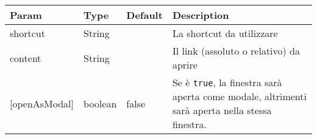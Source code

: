 \begin{longtable}[]{@{}llll@{}}
\toprule
\begin{minipage}[b]{0.22\columnwidth}\raggedright
Param\strut
\end{minipage} & \begin{minipage}[b]{0.22\columnwidth}\raggedright
Type\strut
\end{minipage} & \begin{minipage}[b]{0.22\columnwidth}\raggedright
Default\strut
\end{minipage} & \begin{minipage}[b]{0.22\columnwidth}\raggedright
Description\strut
\end{minipage}\tabularnewline
\midrule
\endhead
\begin{minipage}[t]{0.22\columnwidth}\raggedright
shortcut\strut
\end{minipage} & \begin{minipage}[t]{0.22\columnwidth}\raggedright
String\strut
\end{minipage} & \begin{minipage}[t]{0.22\columnwidth}\raggedright
\strut
\end{minipage} & \begin{minipage}[t]{0.22\columnwidth}\raggedright
La shortcut da utilizzare\strut
\end{minipage}\tabularnewline
\begin{minipage}[t]{0.22\columnwidth}\raggedright
content\strut
\end{minipage} & \begin{minipage}[t]{0.22\columnwidth}\raggedright
String\strut
\end{minipage} & \begin{minipage}[t]{0.22\columnwidth}\raggedright
\strut
\end{minipage} & \begin{minipage}[t]{0.22\columnwidth}\raggedright
Il link (assoluto o relativo) da aprire\strut
\end{minipage}\tabularnewline
\begin{minipage}[t]{0.22\columnwidth}\raggedright
{[}openAsModal{]}\strut
\end{minipage} & \begin{minipage}[t]{0.22\columnwidth}\raggedright
boolean\strut
\end{minipage} & \begin{minipage}[t]{0.22\columnwidth}\raggedright
false\strut
\end{minipage} & \begin{minipage}[t]{0.22\columnwidth}\raggedright
Se è \texttt{true}, la finestra sarà aperta come modale, altrimenti sarà
aperta nella stessa finestra.\strut
\end{minipage}\tabularnewline
\bottomrule
\end{longtable}
